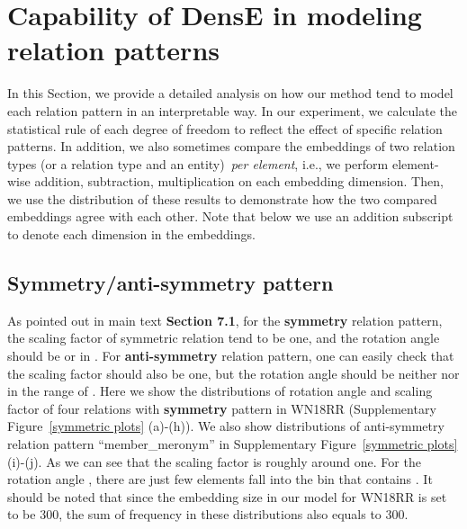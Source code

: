 \documentclass[11pt]{article}
\begin{document}
\section{Capability of DensE in modeling relation patterns}



In this Section, we provide a detailed analysis on how our method tend to model each relation pattern in an interpretable way. In our experiment, we calculate the statistical rule of each degree of freedom to reflect the effect of specific relation patterns. In addition, we also sometimes compare the embeddings of two relation types (or a relation type and an entity)~\textit{per element}, i.e., we perform element-wise addition, subtraction, multiplication on each embedding dimension. Then, we use the distribution of these results to demonstrate how the two compared embeddings agree with each other. Note that below we use an addition subscript  to denote each dimension in the embeddings.



\subsection{Symmetry/anti-symmetry pattern}
As pointed out in main text \textbf{Section 7.1}, for the \textbf{symmetry} relation pattern, the scaling factor  of symmetric relation tend to be one, and the rotation angle  should be  or  in . For \textbf{anti-symmetry} relation pattern, one can easily check that the scaling factor  should also be one, but the rotation angle  should be neither  nor  in the range of . Here we show the distributions of rotation angle  and scaling factor  of four relations with \textbf{symmetry} pattern in WN18RR (Supplementary Figure~\ref{symmetric plots} (a)-(h)). We also show distributions of anti-symmetry relation pattern ``member\_meronym'' in Supplementary Figure~\ref{symmetric plots} (i)-(j). As we can see that the scaling factor is roughly around one. For the rotation angle , there are just few elements fall into the bin that contains . 
It should be noted that since the embedding size  in our model for WN18RR is set to be 300, the sum of frequency in these distributions also equals to 300. 
\end{document}

